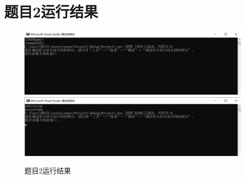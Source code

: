 \section{题目2运行结果}
\begin{figure}[ht]

    \centering
    \includegraphics[scale=0.6]{图片3.png}
    \includegraphics[scale=0.6]{图片4.png}
    \caption{题目2运行结果}
    \label{fig:label}
    \end{figure}


